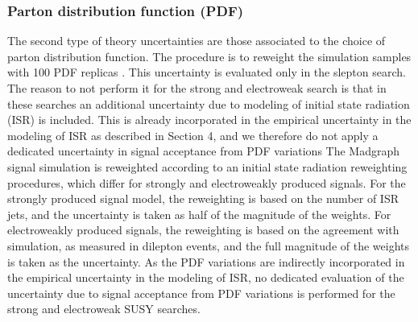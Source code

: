 \subsubsection*{Parton distribution function (PDF)}
\noindent\justify
The second type of theory uncertainties are those associated to the choice of parton distribution function. 
The procedure is to reweight the simulation samples with 100 PDF replicas \cite{Butterworth:2015oua}. This uncertainty is evaluated only in the slepton search. 
The reason to not perform it for the strong and electroweak search is that in these searches an additional uncertainty due to modeling of initial state radiation (ISR) is included. 
This is already incorporated in the empirical
uncertainty in the modeling of ISR as described in Section 4, and we therefore do not apply a
dedicated uncertainty in signal acceptance from PDF variations
The Madgraph signal simulation is reweighted according to an initial state radiation reweighting procedures, which differ for strongly and electroweakly produced signals. 
For the strongly produced signal model, the reweighting is based on the number of ISR jets, and the uncertainty is taken as half of the magnitude of the weights. 
For electroweakly produced signals, the reweighting is based on the \PZ \pt agreement with simulation, as measured in dilepton events, and the full magnitude of the weights is taken as the uncertainty. 
As the PDF variations are indirectly incorporated in the empirical uncertainty in the modeling of ISR, no dedicated evaluation of the uncertainty due to signal acceptance from PDF variations is performed for the strong and electroweak SUSY searches.
